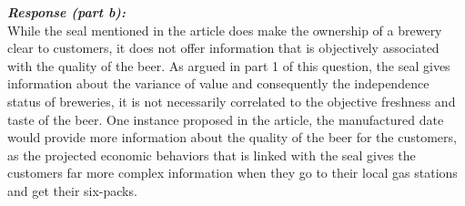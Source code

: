 \documentclass[12pt]{article}
\newcommand\tab[1][1cm]{\hspace*{#1}}
\begin{document}
\textbf{\emph{Response (part b): }} \\
\tab While the seal mentioned in the article does make the ownership of a brewery clear to customers, it does not offer information that is objectively associated with the quality of the beer. As argued in part 1 of this question, the seal gives information about the variance of value and consequently the independence status of breweries, it is not necessarily correlated to the objective freshness and taste of the beer. One instance proposed in the article, the manufactured date would provide more information about the quality of the beer for the customers, as the projected economic behaviors that is linked with the seal gives the customers far more complex information when they go to their local gas stations and get their six-packs.
\end{document}
